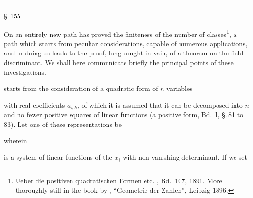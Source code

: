 \begin{center}


\rule{0.3\textwidth}{0.4pt}

\S.\,155.

\end{center}

On an entirely new path  has proved the finiteness of the number of classes\footnote{Ueber die positiven quadratischen Formen etc. , Bd.\ 107, 1891. More thoroughly still in the book by , ``Geometrie der Zahlen'', Leipzig 1896.}, a path which starts from peculiar considerations, capable of numerous applications, and in doing so leads to the proof, long sought in vain, of a theorem on the field discriminant. We shall here communicate briefly the principal points of these investigations.

 starts from the consideration of a quadratic form of $n$ variables


with real coefficients $a_{i,k}$, of which it is assumed that it can be decomposed into $n$ and no fewer positive squares of linear functions (a positive form, Bd.\ I, \S.\,81 to 83). Let one of these representations be

wherein

is a system of linear functions of the $x_i$ with non-vanishing determinant. If we set

